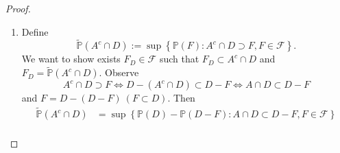 \documentclass[12pt]{article}
\renewcommand{\(}{\left(}%
\renewcommand{\)}{\right)}%
\renewcommand{\[}{\left[}%
\renewcommand{\]}{\right]}%
\newcommand{\p}{\mathbb{P}}
\newcommand{\f}{\mathscr{F}}
\newtheorem{proof}{Proof.}}
\begin{document}
\begin{proof}
\begin{enumerate}
   	 Define $H_1=E_1'$ and $H_n=E_n'/ \cup_{k=1}^{n-1} E_k'$ for $n\geq 2$. Then $\{H_n\}_{n\geq 1}\subset\f$ is disjoint and $\p(H_n)=\p(E_n')$. In fact, we have for any $n\geq 2$,
   		\begin{equation*}
   			\p\(E_n'\cap \bigcup_{k=1}^{n-1} E_k'\)=\p\[\bigcup_{k=1}^{n-1} (E_n'\cap E_k')\]\leq \sum_{k=1}^{n-1}\p(E_n'\cap E_k')=0.
   		\end{equation*}
   		Then for any $n\geq 2$,
   		\begin{equation*}
   			\p(H_n)=\p\(E_n'\bigg/ \bigcup_{k=1}^{n-1} E_k'\)=\p(E_n')-\p\(E_n'\cap \bigcup_{k=1}^{n-1} E_k'\)=\p(E_n').
   		\end{equation*}
   		Therefore
   		\begin{equation*}
   			\begin{split}
   				\sum_{n\geq 1}\p(E_n')&=\sum_{n\geq 1}\p(H_n)=\p\(\sum_{n\geq 1}H_n\)=\p\(\bigcup_{n\geq 1}E_n'\)\\
   				&=\p(E_{\geq 1})=\widetilde{\p}\(\sum_{n\geq 1}A\cap D_n\).
   			\end{split}
   		\end{equation*}
   		Finally, we have
   		\begin{equation*}
   			\sum_{n\geq 1}\widetilde{\p}(A\cap D_n)=\sum_{n\geq 1}\p(E_n)\leq \sum_{n\geq 1}\p(E_n')= \widetilde{\p}\(\sum_{n\geq 1}A\cap D_n\).
   		\end{equation*}
   		Combine with the former formula, we have proved 
   		\begin{equation*}
   			\widetilde{\p}\(\sum_{n\geq 1}A\cap D_n\)=\sum_{n\geq 1}\widetilde{\p}(A\cap D_n).
   		\end{equation*}
   		\item Define
   	 \begin{equation*}
   	 	\widetilde{\p}(A^c\cap D):=\sup\left \{\p(F):A^c\cap D\supset F,F\in\f\right\}.
   	 \end{equation*}
   	 We want to show exists $F_D\in\f$ such that $F_D\subset A^c\cap D$ and $F_D=\widetilde{\p}(A^c\cap D)$.
   	 Observe 
   	 \begin{equation*}
   	 	A^c\cap D\supset F \Longleftrightarrow D-(A^c\cap D)\subset D-F 
   	 	\Longleftrightarrow A\cap D\subset D-F
   	 \end{equation*}
   	 and $F=D-(D-F)\ (F\subset D)$. Then 
   	 \begin{equation*}
   	 	\begin{split}
   	 		\widetilde{\p}(A^c\cap D)&=\sup\left \{\p(D)-\p(D-F):A\cap D\subset D-F,F\in\f\right\}\\

\end{split}
\end{equation*}
\end{enumerate}
\end{proof}
\end{document}
